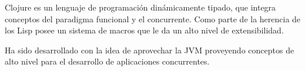 
Clojure es un lenguaje de programación dinámicamente tipado, que integra conceptos del paradigma funcional y el concurrente. Como parte de la herencia de los Lisp posee un sistema de macros que le da un alto nivel de extensibilidad.

Ha sido desarrollado con la idea de aprovechar la JVM proveyendo conceptos de alto nivel para el desarrollo de aplicaciones concurrentes.


